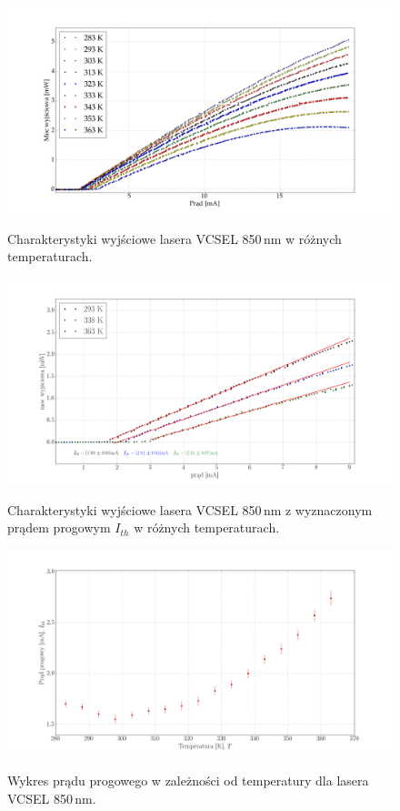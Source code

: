 \documentclass[a4paper, portrait,12pt]{mwrep}
\begin{document}
\begin{figure}
\center
  \includegraphics[scale=0.30]{plot_vcsel850/plot_all.png}
  \label{rys1}
  \caption{Charakterystyki wyjściowe lasera VCSEL 850\,nm w różnych temperaturach.} 
\end{figure}
\begin{figure}
\center
  \includegraphics[scale=0.30]{plot_vcsel850/plot_3_i_th.png}
  \label{rys1}
  \caption{Charakterystyki wyjściowe lasera VCSEL 850\,nm z wyznaczonym prądem progowym $I_{th}$ w różnych temperaturach.} 
\end{figure}
\begin{figure}
\center
  \includegraphics[scale=0.30]{plot_vcsel850/plot_lin_i_th.png}
  \label{rys1}
  \caption{Wykres prądu progowego w zależności od temperatury dla lasera VCSEL 850\,nm.} 
\end{figure}
\end{document}
